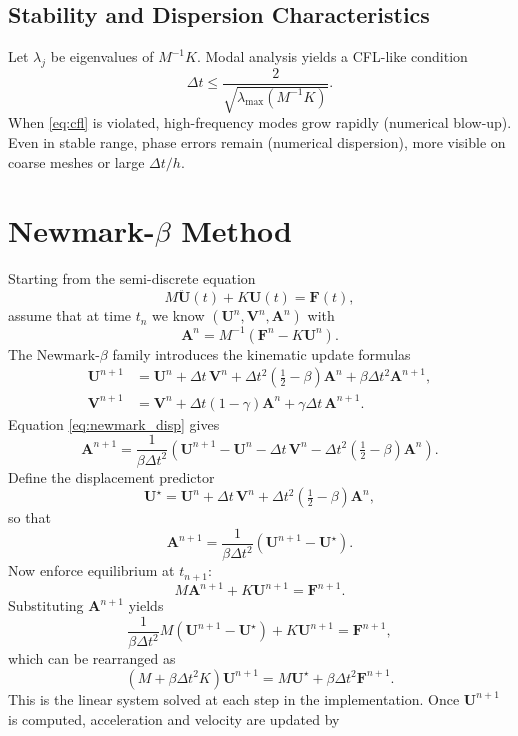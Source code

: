 \documentclass[11pt,a4paper]{report}
\begin{document}
\subsection{Stability and Dispersion Characteristics}
Let $\lambda_j$ be eigenvalues of $M^{-1}K$. Modal analysis yields a CFL-like condition
\begin{equation}
\Delta t\le \frac{2}{\sqrt{\lambda_{\max}(M^{-1}K)}}.
\label{eq:cfl}
\end{equation}
When \eqref{eq:cfl} is violated, high-frequency modes grow rapidly (numerical blow-up). Even in stable range, phase errors remain (numerical dispersion), more visible on coarse meshes or large $\Delta t/h$.

\section{Newmark-\texorpdfstring{$\beta$}{beta} Method}
Starting from the semi-discrete equation
\[
M\ddot{\bm U}(t)+K\bm U(t)=\bm F(t),
\]
assume that at time $t_n$ we know $(\bm U^n,\bm V^n,\bm A^n)$ with
\[
\bm A^n=M^{-1}(\bm F^n-K\bm U^n).
\]
The Newmark-$\beta$ family introduces the kinematic update formulas
\begin{align}
\bm U^{n+1} &= \bm U^n + \Delta t\,\bm V^n
              + \Delta t^2\!\left(\tfrac12-\beta\right)\bm A^n
              + \beta\Delta t^2\bm A^{n+1}, \label{eq:newmark_disp}\\
\bm V^{n+1} &= \bm V^n + \Delta t(1-\gamma)\bm A^n
              + \gamma\Delta t\,\bm A^{n+1}. \label{eq:newmark_vel}
\end{align}
Equation \eqref{eq:newmark_disp} gives
\[
\bm A^{n+1}
=\frac{1}{\beta\Delta t^2}
\left(\bm U^{n+1}-\bm U^n-\Delta t\,\bm V^n
-\Delta t^2\!\left(\tfrac12-\beta\right)\bm A^n\right).
\]
Define the displacement predictor
\[
\bm U^{\star}
=\bm U^n+\Delta t\,\bm V^n+\Delta t^2\!\left(\tfrac12-\beta\right)\bm A^n,
\]
so that
\[
\bm A^{n+1}=\frac{1}{\beta\Delta t^2}\left(\bm U^{n+1}-\bm U^{\star}\right).
\]
Now enforce equilibrium at $t_{n+1}$:
\[
M\bm A^{n+1}+K\bm U^{n+1}=\bm F^{n+1}.
\]
Substituting $\bm A^{n+1}$ yields
\[
\frac{1}{\beta\Delta t^2}M\left(\bm U^{n+1}-\bm U^\star\right)+K\bm U^{n+1}
=\bm F^{n+1},
\]
which can be rearranged as
\begin{equation}
\left(M+\beta\Delta t^2K\right)\bm U^{n+1}
=M\bm U^\star+\beta\Delta t^2\bm F^{n+1}.
\label{eq:newmark_system}
\end{equation}
This is the linear system solved at each step in the implementation. Once
$\bm U^{n+1}$ is computed, acceleration and velocity are updated by
\end{document}
